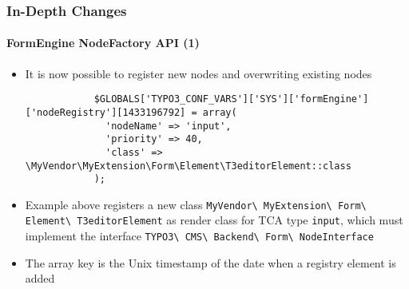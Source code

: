 \begin{frame}[fragile]
	\frametitle{In-Depth Changes}
	\framesubtitle{FormEngine NodeFactory API (1)}

	\lstset{basicstyle=\tiny\ttfamily}

	\begin{itemize}

		\item It is now possible to register new nodes and overwriting existing nodes

		\begin{lstlisting}
			$GLOBALS['TYPO3_CONF_VARS']['SYS']['formEngine']['nodeRegistry'][1433196792] = array(
			  'nodeName' => 'input',
			  'priority' => 40,
			  'class' => \MyVendor\MyExtension\Form\Element\T3editorElement::class
			);
		\end{lstlisting}

		\item Example above registers a new class
			\texttt{MyVendor\textbackslash
				MyExtension\textbackslash
				Form\textbackslash
				Element\textbackslash
				T3editorElement}
			as render class for TCA type \texttt{input}, which must implement the interface
			\texttt{TYPO3\textbackslash
				CMS\textbackslash
				Backend\textbackslash
				Form\textbackslash
				NodeInterface}

		\item The array key is the Unix timestamp of the date when a registry element is added

	\end{itemize}

\end{frame}



